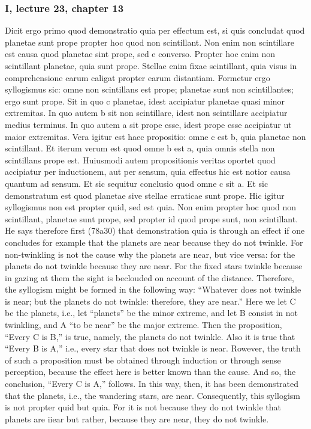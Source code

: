\subsubsection{I, lecture 23, chapter 13}
Dicit ergo primo quod demonstratio quia per effectum est, si quis concludat quod planetae sunt prope propter hoc quod non scintillant. Non enim non scintillare est causa quod planetae sint prope, sed e converso. Propter hoc enim non scintillant planetae, quia sunt prope. Stellae enim fixae scintillant, quia visus in comprehensione earum caligat propter earum distantiam. Formetur ergo syllogismus sic: omne non scintillans est prope; planetae sunt non scintillantes; ergo sunt prope. Sit in quo c planetae, idest accipiatur planetae quasi minor extremitas. In quo autem b sit non scintillare, idest non scintillare accipiatur medius terminus. In quo autem a sit prope esse, idest prope esse accipiatur ut maior extremitas. Vera igitur est haec propositio: omne c est b, quia planetae non scintillant. Et iterum verum est quod omne b est a, quia omnis stella non scintillans prope est. Huiusmodi autem propositionis veritas oportet quod accipiatur per inductionem, aut per sensum, quia effectus hic est notior causa quantum ad sensum. Et sic sequitur conclusio quod omne c sit a. Et sic demonstratum est quod planetae sive stellae erraticae sunt prope. Hic igitur syllogismus non est propter quid, sed est quia. Non enim propter hoc quod non scintillant, planetae sunt prope, sed propter id quod prope sunt, non scintillant.	He says therefore first (78a30) that demonstration quia is through an effect if one concludes for example that the planets are near because they do not twinkle. For non-twinkling is not the cause why the planets are near, but vice versa: for the planets do not twinkle because they are near. For the fixed stars twinkle because in gazing at them the sight is beclouded on account of the distance. Therefore, the syllogism might be formed in the following way: “Whatever does not twinkle is near; but the planets do not twinkle: therefore, they are near.” Here we let C be the planets, i.e., let “planets” be the minor extreme, and let B consist in not twinkling, and A “to be near” be the major extreme. Then the proposition, “Every C is B,” is true, namely, the planets do not twinkle. Also it is true that “Every B is A,” i.e., every star that does not twinkle is near. Rowever, the truth of such a proposition must be obtained through induction or through sense perception, because the effect here is better known than the cause. And so, the conclusion, “Every C is A,” follows. In this way, then, it has been demonstrated that the planets, i.e., the wandering stars, are near. Consequently, this syllogism is not propter quid but quia. For it is not because they do not twinkle that planets are iiear but rather, because they are near, they do not twinkle.

